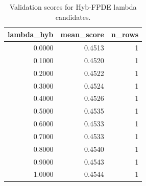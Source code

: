 \begin{table}[t]
\caption{Validation scores for Hyb-FPDE lambda candidates.}
\label{tab:lambda_distribution_computed}
\centering
\begin{tabular}{rrr}
\toprule
lambda\_hyb & mean\_score & n\_rows \\
\midrule
0.0000 & 0.4513 & 1 \\
0.1000 & 0.4520 & 1 \\
0.2000 & 0.4522 & 1 \\
0.3000 & 0.4524 & 1 \\
0.4000 & 0.4526 & 1 \\
0.5000 & 0.4535 & 1 \\
0.6000 & 0.4533 & 1 \\
0.7000 & 0.4533 & 1 \\
0.8000 & 0.4540 & 1 \\
0.9000 & 0.4543 & 1 \\
1.0000 & 0.4544 & 1 \\
\bottomrule
\end{tabular}

\end{table}
